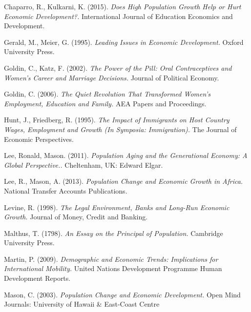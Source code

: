 \documentclass[11pt, english]{article}
\begin{document}
\begin{thebibliography}{9}
                Chaparro, R., Kulkarni, K. (2015).
                \textsl{Does High Population Growth Help or Hurt Economic Development?.}
      		International Journal of Education Economics and Development.
	
                Gerald, M., Meier, G. (1995).
                \textsl{Leading Issues in Economic Development.}
     		Oxford University Press. 
	
                Goldin, C., Katz, F. (2002).             
                \textsl{The Power of the Pill: Oral Contraceptives and Women's Career and Marriage Decisions.}                                            
      		Journal of Political Economy.

        	Goldin, C. (2006).        
		\textsl{The Quiet Revolution That Transformed Women's Employment, Education and Family.}
		AEA Papers and Proceedings.
			
                Hunt, J., Friedberg, R. (1995).           
                \textsl{The Impact of Immigrants on Host Country Wages, Employment and Growth (In Symposia: Immigration).}                          
      		The Journal of Economic Perspectives.
	
                Lee, Ronald, Mason. (2011).
                \textsl{Population Aging and the Generational Economy: A Global Perspective..}                                             
      		Cheltenham, UK: Edward Elgar.
	
                Lee, R., Mason, A. (2013).
		\textsl{Population Change and Economic Growth in Africa.}
		National Transfer Accounts Publications.
			
                Levine, R. (1998).
                \textsl{The Legal Environment, Banks and Long-Run Economic Growth.}
		Journal of Money, Credit and Banking.
	
                Malthus, T. (1798).
                \textsl{An Essay on the Principal of Population.}
     		Cambridge University Press.

                Martin, P. (2009).
		\textsl{Demographic and Economic Trends: Implications for International Mobility.}
		United Nations Development Programme Human Development Reports.
			
                Mason, C. (2003).
                \textsl{Population Change and Economic Development.}                                        Open Mind Journals: University of Hawaii \& East-Coast Centre
	

\end{thebibliography}
\end{document}
